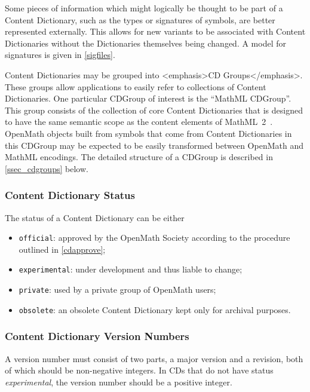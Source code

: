 \documentclass{report}
\def\textquote#1{``#1''}
\def\OM{OpenMath\xspace}
\begin{document}
Some pieces of information which might logically be thought to be part of a Content
Dictionary, such as the types or signatures of symbols, are better represented externally.
This allows for new variants to be associated with Content Dictionaries without the
Dictionaries themselves being changed.  A model for signatures is given in \ref{sigfiles}.
    
Content Dictionaries may be grouped into <emphasis>CD Groups</emphasis>. These groups
allow applications to easily refer to collections of Content Dictionaries. One particular
CDGroup of interest is the \textquote{MathML CDGroup}. This group consists of the
collection of core Content Dictionaries that is designed to have the same semantic scope
as the content elements of MathML~2~\cite{MathML_2003}.  \OM objects built from symbols
that come from Content Dictionaries in this CDGroup may be expected to be easily
transformed between \OM and MathML encodings.  The detailed structure of a CDGroup is
described in \ref{ssec_cdgroups} below.
    
\subsubsection{Content Dictionary Status}\label{sec_status}

The status of a Content Dictionary can be either
\begin{itemize}
\item \lstinline|official|: approved by the \OM Society according to the procedure
  outlined in \ref{cdapprove};
\item \lstinline|experimental|: under development and thus liable to change;
\item \lstinline|private|: used by a private group of \OM users;
\item \lstinline|obsolete|: an obsolete Content Dictionary kept only for archival
  purposes.
\end{itemize}
 
\subsubsection{Content Dictionary Version Numbers}\label{sec_version}
      
A version number must consist of two parts, a major version and a revision, both of which
should be non-negative integers.  In CDs that do not have status \emph{experimental}, the
version number should be a positive integer.
\end{document}
